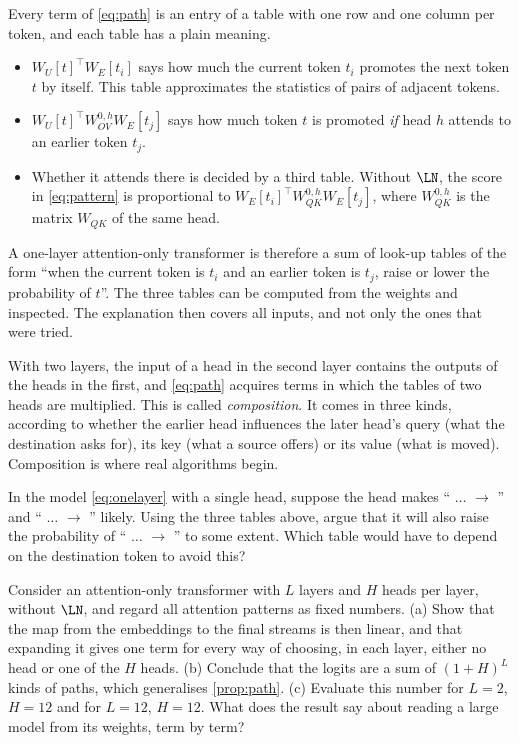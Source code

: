 Every term of \eqref{eq:path} is an entry of a table with one row and one column per token, and each table has
a plain meaning.
\begin{itemize}
\item $W_U[t]^\top W_E[t_i]$ says how much the current token $t_i$ promotes the next token $t$ by itself. This
table approximates the statistics of pairs of adjacent tokens.
\item $W_U[t]^\top W_{OV}^{0,h}W_E[t_j]$ says how much token $t$ is promoted \emph{if} head $h$ attends to an
earlier token $t_j$.
\item Whether it attends there is decided by a third table. Without $\LN$, the score in \eqref{eq:pattern} is
proportional to $W_E[t_i]^\top W_{QK}^{0,h}W_E[t_j]$, where $W_{QK}^{0,h}$ is the matrix $W_{QK}$ of the same head.
\end{itemize}
A one-layer attention-only transformer is therefore a sum of look-up tables of the form ``when the current
token is $t_i$ and an earlier token is $t_j$, raise or lower the probability of $t$''. The three tables can be
computed from the weights and inspected. The explanation then covers all inputs, and not only the ones that
were tried.

With two layers, the input of a head in the second layer contains the outputs of the heads in the first, and
\eqref{eq:path} acquires terms in which the tables of two heads are multiplied. This is called
\emph{composition}. It comes in three kinds, according to whether the earlier head influences the later head's
query (what the destination asks for), its key (what a source offers) or its value (what is moved). Composition is where
real algorithms begin.

\begin{exercise}\label{ex:skiptrigram}
In the model \eqref{eq:onelayer} with a single head, suppose the head makes `` $\dots$ 
$\to$ '' and `` $\dots$  $\to$ '' likely. Using the three tables above,
argue that it will also raise the probability of `` $\dots$  $\to$ '' to some extent.
Which table would have to depend on the destination token to avoid this?
\end{exercise}

\begin{exercise}\label{ex:paths}
Consider an attention-only transformer with $L$ layers and $H$ heads per layer, without $\LN$, and regard all
attention patterns as fixed numbers. (a) Show that the map from the embeddings to the final streams is then
linear, and that expanding it gives one term for every way of choosing, in each layer, either no head or one of
the $H$ heads. (b) Conclude that the logits are a sum of $(1+H)^L$ kinds of paths, which generalises
\cref{prop:path}. (c) Evaluate this number for $L=2$, $H=12$ and for $L=12$, $H=12$. What does the result say
about reading a large model from its weights, term by term?
\end{exercise}

